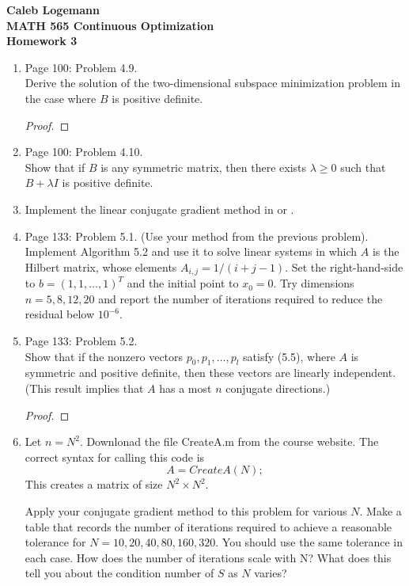 \documentclass[11pt, oneside]{article}
\begin{document}
\noindent \textbf{\Large{Caleb Logemann \\
MATH 565 Continuous Optimization \\
Homework 3
}}

%
\begin{enumerate}
  \item %
    Page 100: Problem 4.9. \\
    Derive the solution of the two-dimensional subspace minimization problem in
    the case where $B$ is positive definite.

    \begin{proof}
      
    \end{proof}

  \item %
    Page 100: Problem 4.10. \\
    Show that if $B$ is any symmetric matrix, then there exists $\lambda \ge 0$
    such that $B + \lambda I$ is positive definite.

  \item %
    Implement the linear conjugate gradient method in \MATLAB or \PYTHON.

  \item %
    Page 133: Problem 5.1. (Use your method from the previous problem). \\
    Implement Algorithm 5.2 and use it to solve linear systems in which $A$
    is the Hilbert matrix, whose elements $A_{i, j} = 1/(i + j - 1)$.
    Set the right-hand-side to $b = (1, 1, \ldots, 1)^T$ and the initial point
    to $x_0 = 0$.
    Try dimensions $n = 5, 8, 12, 20$ and report the number of iterations
    required to reduce the residual below $10^{-6}$.

  \item %
    Page 133: Problem 5.2. \\
    Show that if the nonzero vectors $p_0, p_1, \ldots, p_l$ satisfy (5.5),
    where $A$ is symmetric and positive definite, then these vectors are
    linearly independent.
    (This result implies that $A$ has a most $n$ conjugate directions.)

    \begin{proof}
      
    \end{proof}

  \item %
    Let $n = N^2$.
    Downlonad the \MATLAB file CreateA.m from the course website.
    The correct syntax for calling this code is
    \[
      A = CreateA(N);
    \]
    This creates a matrix of size $N^2 \times N^2$.

    Apply your conjugate gradient method to this problem for various $N$.
    Make a table that records the number of iterations required to achieve a
    reasonable tolerance for $N = 10, 20, 40, 80, 160, 320$.
    You should use the same tolerance in each case.
    How does the number of iterations scale with N?
    What does this tell you about the condition number of $S$ as $N$ varies?
\end{enumerate}
\end{document}
